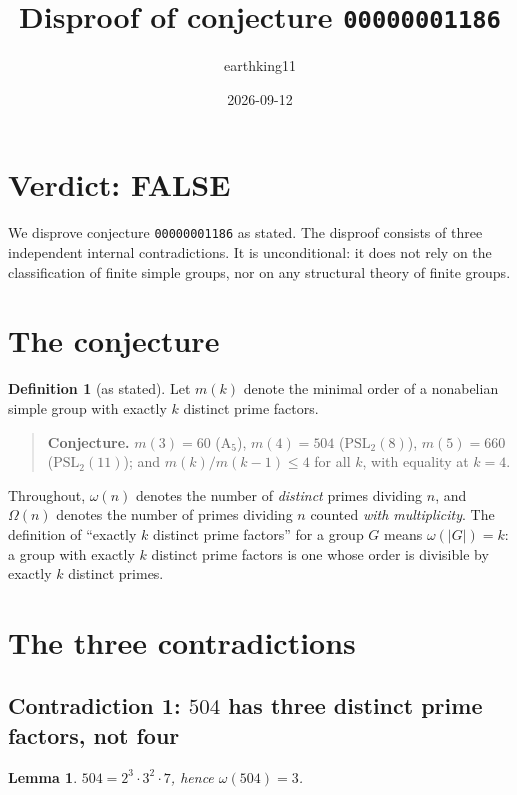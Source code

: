 \documentclass[11pt]{article}
\title{Disproof of conjecture \texttt{00000001186}}
\author{earthking11}
\date{2026-09-12}
\newtheorem{lemma}[theorem]{Lemma}
\theoremstyle{definition}
\newtheorem{definition}[theorem]{Definition}
\theoremstyle{remark}
\begin{document}
\maketitle

\section*{Verdict: FALSE}

We disprove conjecture \texttt{00000001186} as stated. The disproof consists of three
independent internal contradictions. It is unconditional: it does not rely on the
classification of finite simple groups, nor on any structural theory of finite
groups.

\section{The conjecture}

\begin{definition}[as stated]
Let $m(k)$ denote the minimal order of a nonabelian simple group with exactly $k$
distinct prime factors.
\end{definition}

\begin{quote}
\textbf{Conjecture.} $m(3) = 60$ ($\mathrm{A}_5$), $m(4) = 504$
($\mathrm{PSL}_2(8)$), $m(5) = 660$ ($\mathrm{PSL}_2(11)$); and
$m(k)/m(k-1) \le 4$ for all $k$, with equality at $k = 4$.
\end{quote}

Throughout, $\omega(n)$ denotes the number of \emph{distinct} primes dividing $n$,
and $\Omega(n)$ denotes the number of primes dividing $n$ counted \emph{with
multiplicity}. The definition of ``exactly $k$ distinct prime factors'' for a group
$G$ means $\omega(|G|) = k$: a group with exactly $k$ distinct prime factors is one
whose order is divisible by exactly $k$ distinct primes.

\section{The three contradictions}

\subsection*{Contradiction 1: $504$ has three distinct prime factors, not four}

\begin{lemma}
$504 = 2^{3}\cdot 3^{2}\cdot 7$, hence $\omega(504) = 3$.
\end{lemma}
\end{document}
